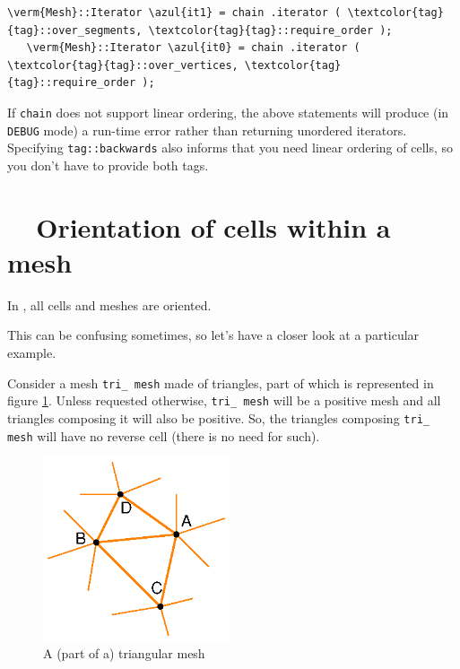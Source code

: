 \begin{Verbatim}[commandchars=\\\{\},formatcom=\small\tt,
   baselinestretch=0.94,framesep=2mm                      ]
   \verm{Mesh}::Iterator \azul{it1} = chain .iterator ( \textcolor{tag}{tag}::over_segments, \textcolor{tag}{tag}::require_order );
   \verm{Mesh}::Iterator \azul{it0} = chain .iterator ( \textcolor{tag}{tag}::over_vertices, \textcolor{tag}{tag}::require_order );
\end{Verbatim}

If {\small\tt chain} does not support linear ordering, the above statements will produce
(in {\small\tt DEBUG} mode) a run-time error rather than returning unordered iterators.
Specifying {\small\tt\textcolor{tag}{tag}::backwards} also informs {\maniFEM} that you need
linear ordering of cells, so you don't have to provide both tags.


\section{~~Orientation of cells within a mesh}\label{\numb section 9.\numb parag 5}

In \maniFEM, all cells and meshes are oriented.

This can be confusing sometimes, so let's have a closer look at a particular example.

Consider a mesh {\small\tt tri\_\,mesh} made of triangles, part of which is represented
in figure \ref{\numb section 9.\numb fig 2}.
Unless requested otherwise, {\small\tt tri\_\,mesh} will be a positive mesh and all triangles
composing it will also be positive.
So, the triangles composing {\small\tt tri\_\,mesh} will have no reverse cell
(there is no need for such).

\begin{figure}[ht] \centering
  \includegraphics[width=55mm]{malha-tri}
  \caption{A (part of a) triangular mesh}
  \label{\numb section 9.\numb fig 2}
\end{figure}

